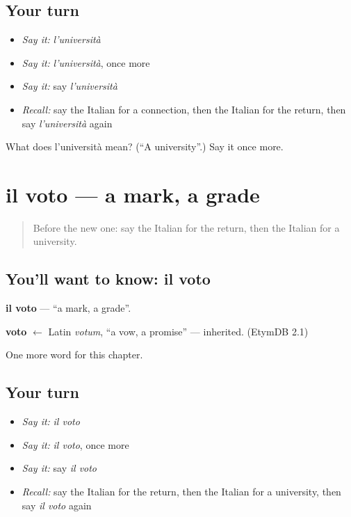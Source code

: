 \subsection*{Your turn}
\begin{itemize}
\raggedright
  \item \emph{Say it:} \emph{l'università}
  \item \emph{Say it:} \emph{l'università}, once more
  \item \emph{Say it:} say \emph{l'università}
  \item \emph{Recall:} say the Italian for a connection, then the Italian for the return, then say \emph{l'università} again
\end{itemize}

\begin{tcolorbox}[breakable,colback=teal!4,colframe=teal!35!black,title={Before you move on}]
What does l'università mean? (\textquotedblleft{}A university\textquotedblright{}.) Say it once more.
\end{tcolorbox}
\section[il voto]{il voto — a mark, a grade}

\label{lesson:IT-C259-voto}



\begin{quote}
Before the new one: say the Italian for the return, then the Italian for a university.
\end{quote}

\subsection*{You'll want to know: il voto}
\textbf{il voto} — \textquotedblleft{}a mark, a grade\textquotedblright{}.

\begin{cousinweb}
\textbf{voto} $\leftarrow$ Latin \emph{votum}, \textquotedblleft{}a vow, a promise\textquotedblright{} — inherited. (EtymDB 2.1)
\end{cousinweb}

\begin{grammarlens}[title={What you've built}]
One more word for this chapter.
\end{grammarlens}

\subsection*{Your turn}
\begin{itemize}
\raggedright
  \item \emph{Say it:} \emph{il voto}
  \item \emph{Say it:} \emph{il voto}, once more
  \item \emph{Say it:} say \emph{il voto}
  \item \emph{Recall:} say the Italian for the return, then the Italian for a university, then say \emph{il voto} again
\end{itemize}

